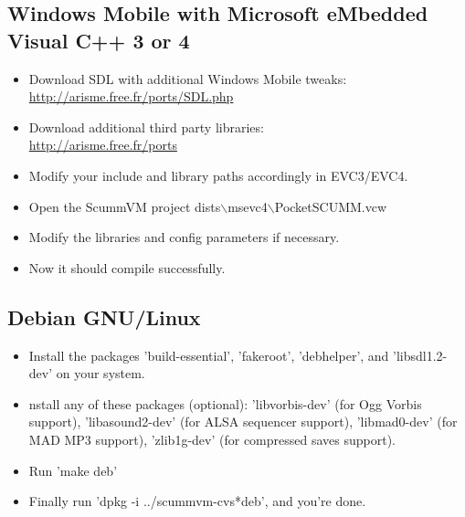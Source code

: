 \subsection{Windows Mobile with Microsoft eMbedded Visual C++ 3 or 4}
  \begin{itemize}
  \item Download SDL with additional Windows Mobile tweaks:\\
    \url{http://arisme.free.fr/ports/SDL.php}
  \item Download additional third party libraries:\\
    \url{http://arisme.free.fr/ports}
  \item Modify your include and library paths accordingly in EVC3/EVC4.
  \item Open the ScummVM project dists$\backslash$msevc4$\backslash$PocketSCUMM.vcw
  \item Modify the libraries and config parameters if necessary.
  \item Now it should compile successfully.
  \end{itemize}
\subsection{Debian GNU/Linux}
  \begin{itemize}
  \item Install the packages 'build-essential', 'fakeroot', 'debhelper',
          and 'libsdl1.2-dev' on your system.
  \item nstall any of these packages (optional): 'libvorbis-dev' (for Ogg
          Vorbis support), 'libasound2-dev' (for ALSA sequencer support),
          'libmad0-dev' (for MAD MP3 support), 'zlib1g-dev' (for compressed
          saves support).
  \item Run 'make deb'
  \item Finally run 'dpkg -i ../scummvm-cvs*deb', and you're done.
  \end{itemize}

